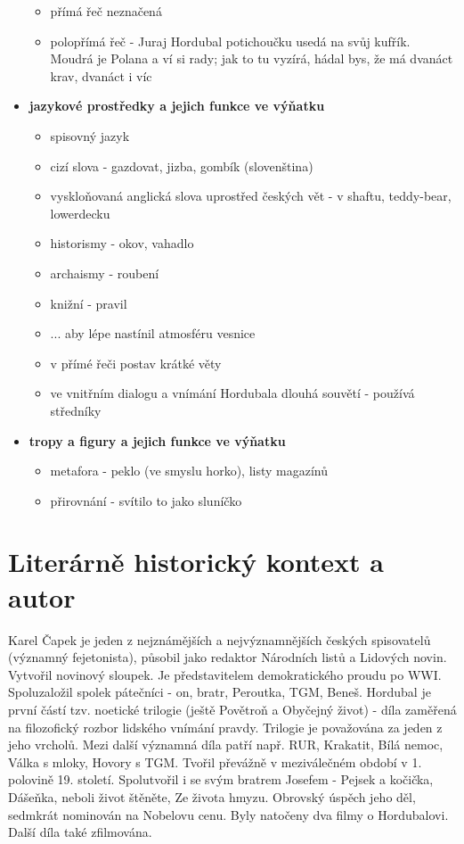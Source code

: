 \documentclass[11pt]{article}
\begin{document}
\begin{itemize}
\begin{itemize}
            \item přímá řeč neznačená
            \item polopřímá řeč -  Juraj Hordubal potichoučku usedá na svůj kufřík. Moudrá je Polana a ví si rady; jak to tu vyzírá, hádal bys, že má dvanáct krav, dvanáct i víc
        \end{itemize}
        \item\textbf{jazykové prostředky a jejich funkce ve výňatku}
        \begin{itemize}
            \item spisovný jazyk
            \item cizí slova - gazdovat, jizba, gombík (slovenština)
            \item vyskloňovaná anglická slova uprostřed českých vět - v shaftu, teddy-bear, lowerdecku
            \item historismy - okov, vahadlo
            \item archaismy - roubení
            \item knižní - pravil
            \item ... aby lépe nastínil atmosféru vesnice
            \item v přímé řeči postav krátké věty
            \item ve vnitřním dialogu a vnímání Hordubala dlouhá souvětí - používá středníky
        \end{itemize}
        \item\textbf{tropy a figury a jejich funkce ve výňatku}
        \begin{itemize}
            \item metafora - peklo (ve smyslu horko), listy magazínů
            \item přirovnání - svítilo to jako sluníčko
        \end{itemize}
    \end{itemize}
    \section*{Literárně historický kontext a autor}
    Karel Čapek je jeden z nejznámějších a nejvýznamnějších českých spisovatelů (významný fejetonista), působil jako redaktor Národních listů a Lidových novin.
    Vytvořil novinový sloupek. Je představitelem demokratického proudu po WWI.
    Spoluzaložil spolek pátečníci - on, bratr, Peroutka, TGM, Beneš.
    Hordubal je první částí tzv. noetické trilogie (ještě Povětroň a Obyčejný život) - díla zaměřená na filozofický rozbor lidského vnímání pravdy. Trilogie je považována za jeden z jeho vrcholů.
    Mezi další významná díla patří např. RUR, Krakatit, Bílá nemoc, Válka s mloky, Hovory s TGM.
    Tvořil převážně v meziválečném období v 1. polovině 19. století.
    Spolutvořil i se svým bratrem Josefem - Pejsek a kočička, Dášeňka, neboli život štěněte, Ze života hmyzu.
    Obrovský úspěch jeho děl, sedmkrát nominován na Nobelovu cenu.
    Byly natočeny dva filmy o Hordubalovi. Další díla také zfilmována.
\end{document}

